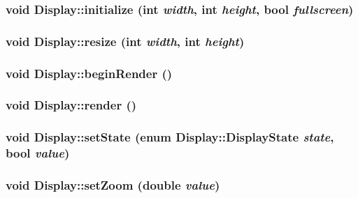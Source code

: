 \subsubsection{\setlength{\rightskip}{0pt plus 5cm}void Display::initialize (int {\em width}, int {\em height}, bool {\em fullscreen})}\label{classEngine_1_1Display_96327276b4548977b31f09d0e7d92cac}


\subsubsection{\setlength{\rightskip}{0pt plus 5cm}void Display::resize (int {\em width}, int {\em height})}\label{classEngine_1_1Display_4d92687cd9e9f4dba7190fcadcf4693e}


\subsubsection{\setlength{\rightskip}{0pt plus 5cm}void Display::beginRender ()}\label{classEngine_1_1Display_7b8fc1027e5371bfe71e75d685e54f3a}


\subsubsection{\setlength{\rightskip}{0pt plus 5cm}void Display::render ()}\label{classEngine_1_1Display_9b83e81da2877f0ceff73881d4ceb3dc}


\subsubsection{\setlength{\rightskip}{0pt plus 5cm}void Display::setState (enum {\bf Display::DisplayState} {\em state}, bool {\em value})}\label{classEngine_1_1Display_0744df71a4a2ee71795d292bca470872}


\subsubsection{\setlength{\rightskip}{0pt plus 5cm}void Display::setZoom (double {\em value})}\label{classEngine_1_1Display_fb25bfa5601c6b68083aa9f9a5b5d1b7}


